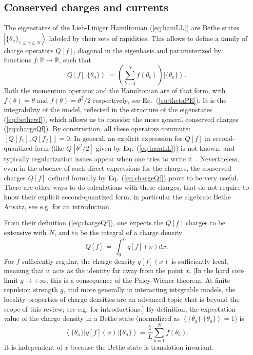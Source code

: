\documentclass[onecolumn,amsfonts,showpacs,superscriptaddress]{revtex4-1}
\begin{document}
\subsection{Conserved charges and currents}
\label{subsec:chargescurrents}
The eigenstates of the Lieb-Liniger Hamiltonian (\ref{eq:hamLL}) are Bethe states $\left| \{ \theta_a\}_{1 \leq a\leq N} \right>$ labeled by their sets of rapidities. This allows to define a family of charge operators $Q[f]$, diagonal in the eigenbasis and parameterized by functions $f : \mathbb{R} \rightarrow \mathbb{R}$, such that
\begin{equation}
    \label{eq:chargeQf}
    Q[f]  \left| \{ \theta_a \} \right> \, = \, \left(\sum_{b=1}^N f(\theta_b) \right) \left| \{ \theta_a \} \right> .
\end{equation}
Both the momentum operator and the Hamiltonian are of that form, with $f(\theta) = \theta$ and $f(\theta) = \theta^2/2$ respectively, see Eq.~(\ref{eq:thetaPE}). It is the integrability of the model, reflected in the structure of the eigenstates (\ref{eq:bethewf}), which allows us to consider the more general conserved charges (\ref{eq:chargeQf}). By construction, all these operators commute: $[Q[f_1], Q[f_2] ] = 0$. In general, an explicit expression for $Q[f]$ in second-quantized form (like $Q[\theta^2/2]$ given by Eq.~(\ref{eq:hamLL})) is not known, and typically regularization issues appear when one tries to write it~\citep{davies1990higher,davies2011higher}. Nevertheless, even in the absence of such direct expressions for the charges, the conserved charges $Q[f]$ defined formally by Eq.~(\ref{eq:chargeQf}) prove to be very useful. There are other ways to do calculations with these charges, that do not require to know their explicit second-quantized form, in particular the algebraic Bethe Ansatz, see e.g. \citep{korepin1997quantum} for an introduction.





From their definition (\ref{eq:chargeQf}), one expects the $Q[f]$ charges to be extensive with $N$, and to be the integral of a charge density
\begin{equation}
    Q[f] \, = \, \int_0^L q[f] (x) dx .
\end{equation}
For $f$ sufficiently regular, the charge density $q[f] (x)$ is sufficiently local, meaning that it acts as the identity far away from the point $x$. [In the hard core limit $g \rightarrow +\infty$, this is a consequence of the Paley-Wiener theorem. At finite repulsion strength $g$, and more generally in interacting integrable models, the locality properties of charge densities are an advanced topic that is  beyond the scope of this review; see e.g. \citep{ilievski2016quasilocal,doyon2017thermalization,palmai2018quasilocal} for introductions.] By definition, the expectation value of the charge density in a Bethe state (normalized as $\left< \{\theta_a \} \left|  \{ \theta_a \} \right> \right. =1$) is
\begin{equation}
    \label{eq:expectationqf}
 \left< \{\theta_a \} \right|  q [f](x)  \left| \{ \theta_a\} \right> = \frac{1}{L} \sum_{b=1}^N f(\theta_b) .
\end{equation}
It is independent of $x$ because the Bethe state is translation invariant.
\end{document}
